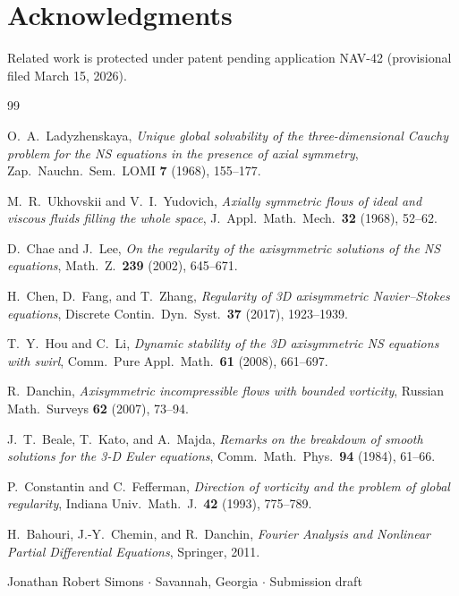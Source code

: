 \documentclass[11pt]{article}
\begin{document}
\section*{Acknowledgments}
Related work is protected under patent pending application NAV-42
(provisional filed March 15, 2026).

\begin{thebibliography}{99}

O.~A.~Ladyzhenskaya,
\textit{Unique global solvability of the three-dimensional Cauchy problem
for the NS equations in the presence of axial symmetry},
Zap.\ Nauchn.\ Sem.\ LOMI \textbf{7} (1968), 155--177.

M.~R.~Ukhovskii and V.~I.~Yudovich,
\textit{Axially symmetric flows of ideal and viscous fluids filling the
whole space}, J.\ Appl.\ Math.\ Mech.\ \textbf{32} (1968), 52--62.

D.~Chae and J.~Lee,
\textit{On the regularity of the axisymmetric solutions of the NS equations},
Math.\ Z.\ \textbf{239} (2002), 645--671.

H.~Chen, D.~Fang, and T.~Zhang,
\textit{Regularity of 3D axisymmetric Navier--Stokes equations},
Discrete Contin.\ Dyn.\ Syst.\ \textbf{37} (2017), 1923--1939.

T.~Y.~Hou and C.~Li,
\textit{Dynamic stability of the 3D axisymmetric NS equations with swirl},
Comm.\ Pure Appl.\ Math.\ \textbf{61} (2008), 661--697.

R.~Danchin,
\textit{Axisymmetric incompressible flows with bounded vorticity},
Russian Math.\ Surveys \textbf{62} (2007), 73--94.

J.~T.~Beale, T.~Kato, and A.~Majda,
\textit{Remarks on the breakdown of smooth solutions for the 3-D Euler equations},
Comm.\ Math.\ Phys.\ \textbf{94} (1984), 61--66.

P.~Constantin and C.~Fefferman,
\textit{Direction of vorticity and the problem of global regularity},
Indiana Univ.\ Math.\ J.\ \textbf{42} (1993), 775--789.

H.~Bahouri, J.-Y.~Chemin, and R.~Danchin,
\textit{Fourier Analysis and Nonlinear Partial Differential Equations},
Springer, 2011.

\end{thebibliography}

\vfill
\begin{center}
{\small Jonathan Robert Simons $\cdot$ Savannah, Georgia $\cdot$ Submission draft}
\end{center}
\end{document}
